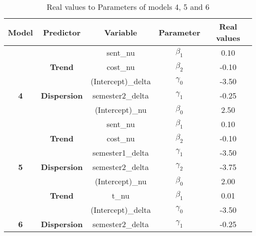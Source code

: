 \begin{table}[h]

\caption{\label{tab:real_value_par}Real values to Parameters of models 4, 5 and 6}
\centering
\begin{tabular}[t]{>{}c>{}cccc}
\toprule
Model & Predictor & Variable & Parameter & Real values\\
\midrule
 &  & sent_nu & $\beta_1$ & 0.10\\

 & \multirow{-2}{*}{\centering\arraybackslash \textbf{Trend}} & cost_nu & $\beta_2$ & -0.10\\

 &  & (Intercept)_delta & $\gamma_0$ & -3.50\\

\multirow{-4}{*}{\centering\arraybackslash \textbf{4}} & \multirow{-2}{*}{\centering\arraybackslash \textbf{Dispersion}} & semester2_delta & $\gamma_1$ & -0.25\\
\cmidrule{1-5}
 &  & (Intercept)_nu & $\beta_0$ & 2.50\\

 &  & sent_nu & $\beta_1$ & 0.10\\

 & \multirow{-3}{*}{\centering\arraybackslash \textbf{Trend}} & cost_nu & $\beta_2$ & -0.10\\

 &  & semester1_delta & $\gamma_1$ & -3.50\\

\multirow{-5}{*}{\centering\arraybackslash \textbf{5}} & \multirow{-2}{*}{\centering\arraybackslash \textbf{Dispersion}} & semester2_delta & $\gamma_2$ & -3.75\\
\cmidrule{1-5}
 &  & (Intercept)_nu & $\beta_0$ & 2.00\\

 & \multirow{-2}{*}{\centering\arraybackslash \textbf{Trend}} & t_nu & $\beta_1$ & 0.01\\

 &  & (Intercept)_delta & $\gamma_0$ & -3.50\\

\multirow{-4}{*}{\centering\arraybackslash \textbf{6}} & \multirow{-2}{*}{\centering\arraybackslash \textbf{Dispersion}} & semester2_delta & $\gamma_1$ & -0.25\\
\bottomrule
\end{tabular}
\end{table}
